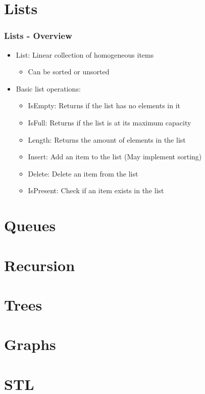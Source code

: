 \documentclass[c, aspectratio=169]{beamer}
\begin{document}
\section{Lists}
\begin{frame}\frametitle{Lists - Overview}
\begin{itemize}
\item List: Linear collection of homogeneous items
	\begin{itemize}
	\item Can be sorted or unsorted
	\end{itemize}
\item Basic list operations:
	\begin{itemize}
	\item IsEmpty: Returns if the list has no elements in it
	\item IsFull: Returns if the list is at its maximum capacity
	\item Length: Returns the amount of elements in the list
	\item Insert: Add an item to the list (May implement sorting)
	\item Delete: Delete an item from the list
	\item IsPresent: Check if an item exists in the list
	\end{itemize}
\end{itemize}
\end{frame}

\begin{frame}\end{frame}
\begin{frame}\end{frame}

\section{Queues}



\section{Recursion}

\section{Trees}



\section{Graphs}




\section{STL}
\end{document}
